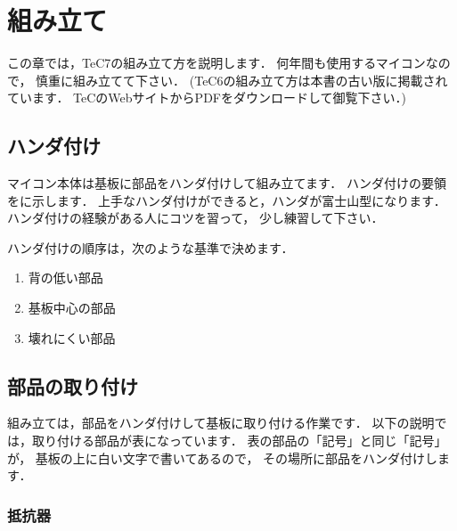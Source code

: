 \renewcommand{\myepsfbox}[1]{\epsfbox{chap3/#1}}

\chapter{組み立て}

この章では，TeC7の組み立て方を説明します．
何年間も使用するマイコンなので，
慎重に組み立てて下さい．
(TeC6の組み立て方は本書の古い版に掲載されています．
TeCのWebサイトからPDFをダウンロードして御覧下さい．)

\section{ハンダ付け}

マイコン本体は基板に部品をハンダ付けして組み立てます．
ハンダ付けの要領をに示します．
上手なハンダ付けができると，ハンダが富士山型になります．
ハンダ付けの経験がある人にコツを習って，
少し練習して下さい．


ハンダ付けの順序は，次のような基準で決めます．

\begin{enumerate}
\item 背の低い部品
\item 基板中心の部品
\item 壊れにくい部品
\end{enumerate}

\section{部品の取り付け}
組み立ては，部品をハンダ付けして基板に取り付ける作業です．
以下の説明では，取り付ける部品が表になっています．
表の部品の「記号」と同じ「記号」が，
基板の上に白い文字で書いてあるので，
その場所に部品をハンダ付けします．

%

\subsection{抵抗器}

